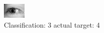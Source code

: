 \begin{figure}[h!]
\begin{center}
\includegraphics[width=0.60\columnwidth]{figures/ID3205_class_3_target_4.png}
\end{center}
\caption{ Classification: 3 actual target: 4}
\label{fig:ID3205_class_3_target_4}
\end{figure}
